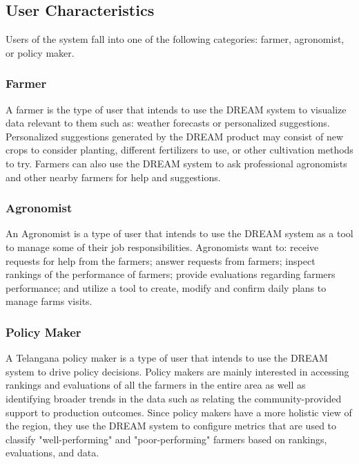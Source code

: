 \subsection{User Characteristics}
\begin{flushleft}
Users of the system fall into one of the following categories: farmer, agronomist, or policy maker.
\subsubsection{Farmer}
A farmer is the type of user that intends to use the DREAM system to visualize data relevant to them such as: weather forecasts or personalized suggestions. Personalized suggestions generated by the DREAM product may consist of new crops to consider planting, different fertilizers to use, or other cultivation methods to try. Farmers can also use the DREAM system to ask professional agronomists and other nearby farmers for help and suggestions.\\
\subsubsection{Agronomist}
An Agronomist is a type of user that intends to use the DREAM system as a tool to manage some of their job responsibilities. Agronomists want to: receive requests for help from the farmers; answer requests from farmers; inspect rankings of the performance of farmers; provide evaluations regarding farmers performance; and utilize a tool to create, modify and confirm daily plans to manage farms visits.
\subsubsection{Policy Maker}
A Telangana policy maker is a type of user that intends to use the DREAM system to drive policy decisions. Policy makers are mainly interested in accessing rankings and evaluations of all the farmers in the entire area as well as identifying broader trends in the data such as relating the community-provided support to production outcomes. Since policy makers have a more holistic view of the region, they use the DREAM system to configure metrics that are used to classify "well-performing" and "poor-performing" farmers based on rankings, evaluations, and data.\\
\end{flushleft}





